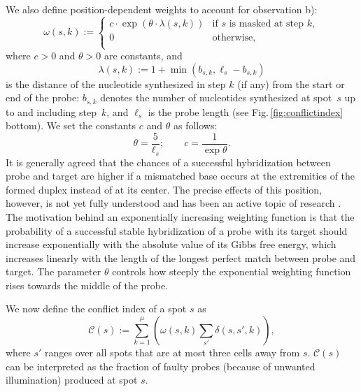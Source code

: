 \documentclass{llncs}
\begin{document}
We also define position-dependent weights to account for observation b):
\begin{equation}\label{eq:pos_mult}
\omega(s,k) :=
\left\{
  \begin{array}{ll}
    c \cdot \exp{\left(\theta \cdot \lambda(s,k)\right)} & \mbox{if $s$ is masked at step $k$}, \\
    0 & \mbox{otherwise}, \\
  \end{array}
\right.
\end{equation}
where $c>0$ and $\theta>0$ are constants, and
\begin{equation}\label{eq:base_pos}
  \lambda(s,k) := 1 + \min(b_{s,k},\ell_{s} - b_{s,k})
\end{equation}
is the distance of the nucleotide synthesized in step $k$ (if any)
from the start or end of the probe: $b_{s,k}$ denotes the number of
nucleotides synthesized at spot~$s$ up to and including step~$k$, and
$\ell_s$ is the probe length (see Fig.\,\ref{fig:conflictindex}
bottom). We set the constants $c$ and $\theta$ as follows:
\[ \theta = \frac{5}{\ell_s}; \qquad c = \frac{1}{\exp{\theta}}. \]
It is generally agreed that the chances of a successful hybridization
between probe and target are higher if a mismatched base occurs at the
extremities of the formed duplex instead of at its center. The precise
effects of this position, however, is not yet fully understood and has
been an active topic of research \cite{BINDER05}. The motivation
behind an exponentially increasing weighting function is that the
probability of a successful stable hybridization of a probe with its
target should increase exponentially with the absolute value of its
Gibbs free energy, which increases linearly with the length of the
longest perfect match between probe and target. The parameter $\theta$
controls how steeply the exponential weighting function rises towards
the middle of the probe.

We now define the conflict index of a spot $s$ as
\begin{equation}
\label{eq:conf_idx}
\mathcal{C}(s) := \sum_{k=1}^{\mu} \left( \omega(s,k) \sum_{s'} \delta(s,s',k) \right),
\end{equation}
where $s'$ ranges over all spots that are at most three cells away
from $s$.  $\mathcal{C}(s)$ can be interpreted as the fraction of
faulty probes (because of unwanted illumination) produced at spot $s$.
\end{document}
